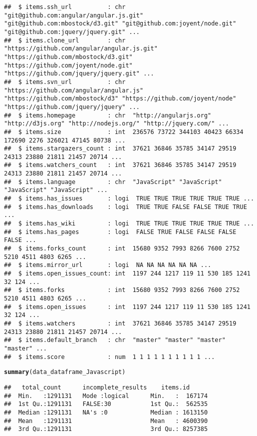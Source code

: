 \documentclass{article}\usepackage[]{graphicx}\usepackage[]{color}
\makeatletter
\newcommand{\hlstd}[1]{\textcolor[rgb]{0.345,0.345,0.345}{#1}}%
\newcommand{\hlkwd}[1]{\textcolor[rgb]{0.737,0.353,0.396}{\textbf{#1}}}%
\newenvironment{kframe}{%
 \def\at@end@of@kframe{}%
 \ifinner\ifhmode%
  \def\at@end@of@kframe{\end{minipage}}%
  \begin{minipage}{\columnwidth}%
 \fi\fi%
 \def\FrameCommand##1{\hskip\@totalleftmargin \hskip-\fboxsep
 \colorbox{shadecolor}{##1}\hskip-\fboxsep
     \hskip-\linewidth \hskip-\@totalleftmargin \hskip\columnwidth}%
 \MakeFramed {\advance\hsize-\width
   \@totalleftmargin\z@ \linewidth\hsize
   \@setminipage}}%
 {\par\unskip\endMakeFramed%
 \at@end@of@kframe}
\newenvironment{knitrout}{}{} %
\makeatother
\begin{document}
\begin{knitrout}
\begin{kframe}
\begin{verbatim}
##  $ items.ssh_url          : chr  "git@github.com:angular/angular.js.git" "git@github.com:mbostock/d3.git" "git@github.com:joyent/node.git" "git@github.com:jquery/jquery.git" ...
##  $ items.clone_url        : chr  "https://github.com/angular/angular.js.git" "https://github.com/mbostock/d3.git" "https://github.com/joyent/node.git" "https://github.com/jquery/jquery.git" ...
##  $ items.svn_url          : chr  "https://github.com/angular/angular.js" "https://github.com/mbostock/d3" "https://github.com/joyent/node" "https://github.com/jquery/jquery" ...
##  $ items.homepage         : chr  "http://angularjs.org" "http://d3js.org" "http://nodejs.org/" "http://jquery.com/" ...
##  $ items.size             : int  236576 73722 344103 40423 66334 172690 2276 326021 47145 80738 ...
##  $ items.stargazers_count : int  37621 36846 35785 34147 29519 24313 23880 21811 21457 20714 ...
##  $ items.watchers_count   : int  37621 36846 35785 34147 29519 24313 23880 21811 21457 20714 ...
##  $ items.language         : chr  "JavaScript" "JavaScript" "JavaScript" "JavaScript" ...
##  $ items.has_issues       : logi  TRUE TRUE TRUE TRUE TRUE TRUE ...
##  $ items.has_downloads    : logi  TRUE TRUE FALSE FALSE TRUE TRUE ...
##  $ items.has_wiki         : logi  TRUE TRUE TRUE TRUE TRUE TRUE ...
##  $ items.has_pages        : logi  FALSE TRUE FALSE FALSE FALSE FALSE ...
##  $ items.forks_count      : int  15680 9352 7993 8266 7600 2752 5210 4511 4803 6265 ...
##  $ items.mirror_url       : logi  NA NA NA NA NA NA ...
##  $ items.open_issues_count: int  1197 244 1217 119 11 530 185 1241 32 124 ...
##  $ items.forks            : int  15680 9352 7993 8266 7600 2752 5210 4511 4803 6265 ...
##  $ items.open_issues      : int  1197 244 1217 119 11 530 185 1241 32 124 ...
##  $ items.watchers         : int  37621 36846 35785 34147 29519 24313 23880 21811 21457 20714 ...
##  $ items.default_branch   : chr  "master" "master" "master" "master" ...
##  $ items.score            : num  1 1 1 1 1 1 1 1 1 1 ...
\end{verbatim}
\begin{alltt}
\hlkwd{summary}\hlstd{(data_dataframe_Javascript)}
\end{alltt}
\begin{verbatim}
##   total_count      incomplete_results    items.id       
##  Min.   :1291131   Mode :logical      Min.   :  167174  
##  1st Qu.:1291131   FALSE:30           1st Qu.:  562535  
##  Median :1291131   NA's :0            Median : 1613150  
##  Mean   :1291131                      Mean   : 4600390  
##  3rd Qu.:1291131                      3rd Qu.: 8257385  

\end{verbatim}
\end{kframe}
\end{knitrout}
\end{document}
